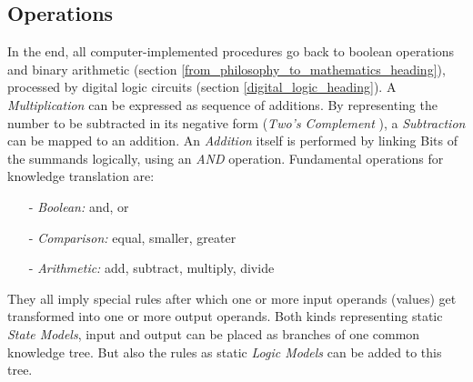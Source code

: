 %
%
%
%
%
%
%

\subsection{Operations}
\label{operations_heading}

In the end, all computer-implemented procedures go back to boolean operations
and binary arithmetic (section \ref{from_philosophy_to_mathematics_heading}),
processed by digital logic circuits (section \ref{digital_logic_heading}). A
\emph{Multiplication} can be expressed as sequence of additions. By
representing the number to be subtracted in its negative form
(\emph{Two's Complement} \cite{philippow}), a \emph{Subtraction} can be mapped
to an addition. An \emph{Addition} itself is performed by linking Bits of the
summands logically, using an \emph{AND} operation. Fundamental operations for
knowledge translation are:

\begin{itemize}
    \item[-] \emph{Boolean:} and, or
    \item[-] \emph{Comparison:} equal, smaller, greater
    \item[-] \emph{Arithmetic:} add, subtract, multiply, divide
\end{itemize}

They all imply special rules after which one or more input operands (values)
get transformed into one or more output operands. Both kinds representing
static \emph{State Models}, input and output can be placed as branches of one
common knowledge tree. But also the rules as static \emph{Logic Models} can be
added to this tree.
